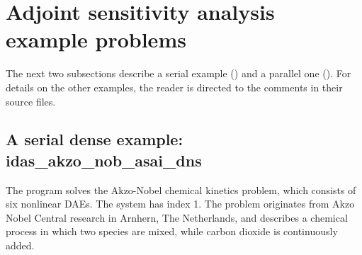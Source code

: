 \section{Adjoint sensitivity analysis example problems}\label{s:adj_examples}

The next two subsections describe a serial example () and
a parallel one ().
For details on the other examples, the reader is directed to the comments in their
source files.

\subsection{A serial dense example: idas\_akzo\_nob\_asai\_dns}\label{ss:idas_akzo_nob_asai_dns}

The  program solves the Akzo-Nobel chemical kinetics
problem, which consists of six nonlinear DAEs.  The system has index 1.
The problem originates from Akzo Nobel Central research in Arnhern,
The Netherlands, and describes a chemical process in which two species
are mixed, while carbon dioxide is continuously added.

